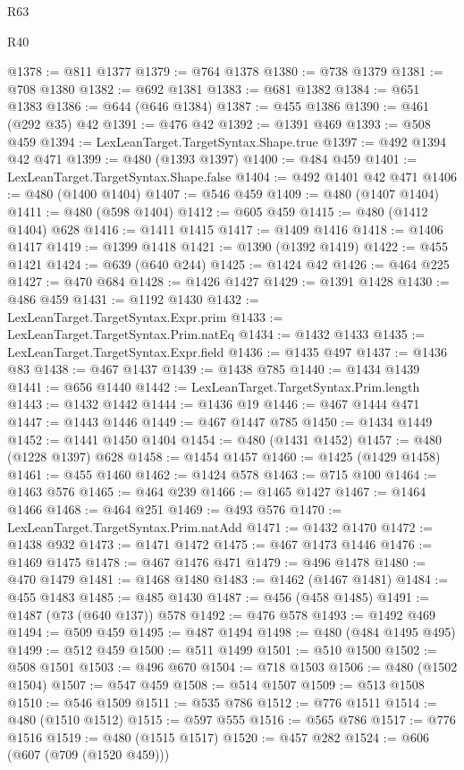 \begin{lexlean}{R63}
\begin{lexlean}{R40}
\begin{coremodule}
{{{{{{{{{{{{{{{{{{{{{{{{{{{{{{{{{{{{{{{{{{{{{{{{{{{{{{{{{{{{{{{{{{{{{{{{{{{{{{{{{{{{{{{{{{{{{{{{{{{{{{{{{{{{{@1378 := @811 @1377
@1379 := @764 @1378
@1380 := @738 @1379
@1381 := @708 @1380
@1382 := @692 @1381
@1383 := @681 @1382
@1384 := @651 @1383
@1386 := @644 (@646 @1384)
@1387 := @455 @1386
@1390 := @461 (@292 @35) @42
@1391 := @476 @42
@1392 := @1391 @469
@1393 := @508 @459
@1394 := LexLeanTarget.TargetSyntax.Shape.true
@1397 := @492 @1394 @42 @471
@1399 := @480 (@1393 @1397)
@1400 := @484 @459
@1401 := LexLeanTarget.TargetSyntax.Shape.false
@1404 := @492 @1401 @42 @471
@1406 := @480 (@1400 @1404)
@1407 := @546 @459
@1409 := @480 (@1407 @1404)
@1411 := @480 (@598 @1404)
@1412 := @605 @459
@1415 := @480 (@1412 @1404) @628
@1416 := @1411 @1415
@1417 := @1409 @1416
@1418 := @1406 @1417
@1419 := @1399 @1418
@1421 := @1390 (@1392 @1419)
@1422 := @455 @1421
@1424 := @639 (@640 @244)
@1425 := @1424 @42
@1426 := @464 @225
@1427 := @470 @684
@1428 := @1426 @1427
@1429 := @1391 @1428
@1430 := @486 @459
@1431 := @1192 @1430
@1432 := LexLeanTarget.TargetSyntax.Expr.prim
@1433 := LexLeanTarget.TargetSyntax.Prim.natEq
@1434 := @1432 @1433
@1435 := LexLeanTarget.TargetSyntax.Expr.field
@1436 := @1435 @497
@1437 := @1436 @83
@1438 := @467 @1437
@1439 := @1438 @785
@1440 := @1434 @1439
@1441 := @656 @1440
@1442 := LexLeanTarget.TargetSyntax.Prim.length
@1443 := @1432 @1442
@1444 := @1436 @19
@1446 := @467 @1444 @471
@1447 := @1443 @1446
@1449 := @467 @1447 @785
@1450 := @1434 @1449
@1452 := @1441 @1450 @1404
@1454 := @480 (@1431 @1452)
@1457 := @480 (@1228 @1397) @628
@1458 := @1454 @1457
@1460 := @1425 (@1429 @1458)
@1461 := @455 @1460
@1462 := @1424 @578
@1463 := @715 @100
@1464 := @1463 @576
@1465 := @464 @239
@1466 := @1465 @1427
@1467 := @1464 @1466
@1468 := @464 @251
@1469 := @493 @576
@1470 := LexLeanTarget.TargetSyntax.Prim.natAdd
@1471 := @1432 @1470
@1472 := @1438 @932
@1473 := @1471 @1472
@1475 := @467 @1473 @1446
@1476 := @1469 @1475
@1478 := @467 @1476 @471
@1479 := @496 @1478
@1480 := @470 @1479
@1481 := @1468 @1480
@1483 := @1462 (@1467 @1481)
@1484 := @455 @1483
@1485 := @485 @1430
@1487 := @456 (@458 @1485)
@1491 := @1487 (@73 (@640 @137)) @578
@1492 := @476 @578
@1493 := @1492 @469
@1494 := @509 @459
@1495 := @487 @1494
@1498 := @480 (@484 @1495 @495)
@1499 := @512 @459
@1500 := @511 @1499
@1501 := @510 @1500
@1502 := @508 @1501
@1503 := @496 @670
@1504 := @718 @1503
@1506 := @480 (@1502 @1504)
@1507 := @547 @459
@1508 := @514 @1507
@1509 := @513 @1508
@1510 := @546 @1509
@1511 := @535 @786
@1512 := @776 @1511
@1514 := @480 (@1510 @1512)
@1515 := @597 @555
@1516 := @565 @786
@1517 := @776 @1516
@1519 := @480 (@1515 @1517)
@1520 := @457 @282
@1524 := @606 (@607 (@709 (@1520 @459)))
}}}}}}}}}}}}}}}}}}}}}}}}}}}}}}}}}}}}}}}}}}}}}}}}}}}}}}}}}}}}}}}}}}}}}}}}}}}}}}}}}}}}}}}}}}}}}}}}}}}}}}}}}}}}}
\end{coremodule}
\end{lexlean}
\end{lexlean}
